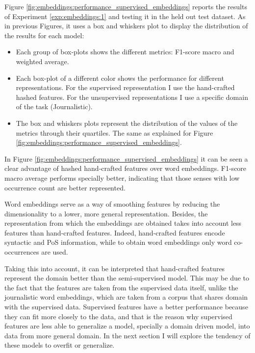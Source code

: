 Figure \ref{fig:embeddings:performance_supervised_embeddings} reports
the results of Experiment \ref{exp:embeddings:1} and testing it in the held
out test dataset. As in previous Figures, it uses a box and whiskers plot to
display the distribution of the results for each model:

\begin{itemize}
  \item Each group of box-plots shows the different metrics: F1-score macro
    and weighted average.
  \item Each box-plot of a different color shows the performance for different
    representations. For the supervised representation I use the hand-crafted
    hashed features. For the unsupervised representations I use a specific
    domain of the task (Journalistic).
  \item The box and whiskers plots represent the distribution of the values of
    the metrics through their quartiles. The same as explained for Figure
    \ref{fig:embeddings:performance_supervised_embeddings}.
\end{itemize}

In Figure \ref{fig:embeddings:performance_supervised_embeddings} it can
be seen a clear advantage of hashed hand-crafted features over word embeddings.
F1-score macro average performs specially better, indicating that those senses
with low occurrence count are better represented. 

Word embeddings serve as a way of smoothing features by reducing the
dimensionality to a lower, more general representation. Besides, the
representation from which the embeddings are obtained takes into account less
features than hand-crafted features. Indeed, hand-crafted features encode
syntactic and PoS information, while to obtain word embeddings only word
co-occurrences are used.

Taking this into account, it can be interpreted that hand-crafted features
represent the domain better than the semi-supervised model. This may be due to
the fact that the features are taken from the supervised data itself, unlike
the journalistic word embeddings, which are taken from a corpus that shares
domain with the supervised data. Supervised features have a better performance
because they can fit more closely to the data, and that is the reason why
supervised features are less able to generalize a model, specially a domain
driven model, into data from more general domain. In the next section I will
explore the tendency of these models to overfit or generalize.

